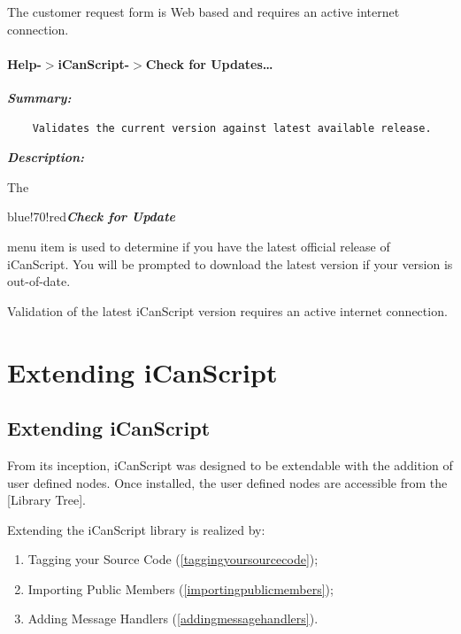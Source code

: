 The customer request form is Web based and requires an active internet connection.

\subsection{Help-$>$iCanScript-$>$Check for Updates{\ldots}}
\label{help-icanscript-checkforupdates}

\emph{\textbf{Summary:}}

\begin{verbatim}
    Validates the current version against latest available release.
\end{verbatim}

\emph{\textbf{Description:}}

The \begin{color}{blue!70!red}\emph{\textbf{Check for Update}}\end{color} menu item is used to determine if you have the latest official release of iCanScript. You will be prompted to download the latest version if your version is out-of-date.

Validation of the latest iCanScript version requires an active internet connection.

\pagebreak 

\part{Extending iCanScript}
\label{extendingicanscript}

\chapter{Extending iCanScript}
\label{extendingicanscript}

From its inception, iCanScript was designed to be extendable with the addition of user defined nodes. Once installed, the user defined nodes are accessible from the [Library Tree].

Extending the iCanScript library is realized by:

\begin{enumerate}
\item Tagging your Source Code (\autoref{taggingyoursourcecode});

\item Importing Public Members (\autoref{importingpublicmembers});

\item Adding Message Handlers (\autoref{addingmessagehandlers}).

\end{enumerate}

